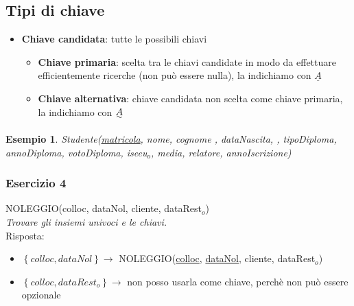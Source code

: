 \documentclass[12pt]{article}
\newtheorem{example}{Esempio}
\begin{document}
\subsection{Tipi di chiave}
\begin{itemize}
    \setlength\itemsep{0em} 
    \item \textbf{Chiave candidata}: tutte le possibili chiavi
    \begin{itemize}
        \item \textbf{Chiave primaria}: scelta tra le chiavi candidate in modo da effettuare efficientemente ricerche (non può essere nulla), la indichiamo con \(\underline{A}\)
        \item \textbf{Chiave alternativa}: chiave candidata non scelta come chiave primaria, la indichiamo con \(\uwave{A}\)
    \end{itemize}
\end{itemize}
\begin{example}
    Studente(\uline{matricola}, nome, cognome , dataNascita, , tipoDiploma, annoDiploma, votoDiploma, iseeu\(_{o}\), media, relatore, annoIscrizione)
\end{example}
\subsubsection{Esercizio 4}
NOLEGGIO(colloc, dataNol, cliente, dataRest\(_{o}\))\\
\textit{Trovare gli insiemi univoci e le chiavi.}\\
Risposta:
\begin{itemize}
    \setlength\itemsep{0em}
    \item \(\left\{colloc, dataNol\right\} \rightarrow\) NOLEGGIO(\uline{colloc}, \uline{dataNol}, cliente, dataRest\(_{o}\))
    \item \(\left\{colloc, dataRest_{o}\right\} \rightarrow\) non posso usarla come chiave, perchè non può essere opzionale
\end{itemize}
\end{document}

